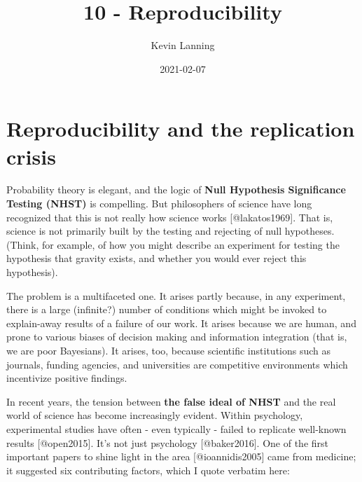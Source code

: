\documentclass[
]{article}
\title{10 - Reproducibility}
\author{Kevin Lanning}
\date{2021-02-07}
\begin{document}
\maketitle

\hypertarget{reproducibility-and-the-replication-crisis}{%
\section{Reproducibility and the replication
crisis}\label{reproducibility-and-the-replication-crisis}}

Probability theory is elegant, and the logic of \textbf{Null Hypothesis
Significance Testing (NHST)} is compelling. But philosophers of science
have long recognized that this is not really how science works
{[}@lakatos1969{]}. That is, science is not primarily built by the
testing and rejecting of null hypotheses. (Think, for example, of how
you might describe an experiment for testing the hypothesis that gravity
exists, and whether you would ever reject this hypothesis).

The problem is a multifaceted one. It arises partly because, in any
experiment, there is a large (infinite?) number of conditions which
might be invoked to explain-away results of a failure of our work. It
arises because we are human, and prone to various biases of decision
making and information integration (that is, we are poor Bayesians). It
arises, too, because scientific institutions such as journals, funding
agencies, and universities are competitive environments which
incentivize positive findings.

In recent years, the tension between \textbf{the false ideal of NHST}
and the real world of science has become increasingly evident. Within
psychology, experimental studies have often - even typically - failed to
replicate well-known results {[}@open2015{]}. It's not just psychology
{[}@baker2016{]}. One of the first important papers to shine light in
the area {[}@ioannidis2005{]} came from medicine; it suggested six
contributing factors, which I quote verbatim here:
\end{document}
